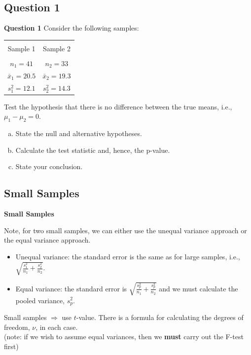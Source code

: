 \documentclass[compress]{beamer}        %
\makeatletter
\newcommand{\tcb}{\textcolor{beamer@blendedblue}}
\makeatother
\begin{document}
\subsection{Question 1}
\begin{frame}{\bf \tcb{Question 1}}
Consider the following samples:
\begin{center}
\begin{tabular}{|c|c|}
\hline
&\\[-0.3cm]
Sample 1 &  Sample 2 \\
\hline
&\\[-0.2cm]
$n_1 = 41$       & $n_2 = 33$       \\[0.2cm]
$\bar x_1 = 20.5$  & $\bar x_2 = 19.3$  \\[0.2cm]
$s_1^2 = 12.1$       & $s_2^2 = 14.3$        \\[0.2cm]
\hline
\end{tabular}
\end{center}

Test the hypothesis that there is no difference between the true means, i.e., $\mu_1-\mu_2=0$.\\
\begin{enumerate}[a)]\itemsep0.3cm
\item State the null and alternative hypotheses.
\item Calculate the test statistic and, hence, the p-value.
\item State your conclusion.
\end{enumerate}


\end{frame}







\subsection{Small Samples}
\begin{frame}{\bf \tcb{Small Samples}}

Note, for two small samples, we can either use the unequal variance approach or the equal variance approach.\\[0.4cm]
\begin{itemize}
\item Unequal variance: the standard error is the same as for large samples, i.e., $\sqrt{\frac{s_1^2}{n_1}+\frac{s_2^2}{n_2}}$.
\item Equal variance: the standard error is $\sqrt{\frac{s_p^2}{n_1}+\frac{s_p^2}{n_2}}$ and we must calculate the pooled variance, $s_p^2$.\\[0.8cm]
\end{itemize}

Small samples $\Rightarrow$ use $t$-value. There is a formula for calculating the degrees of freedom, $\nu$, in each case.\\[0.5cm]

{\footnotesize(note: if we wish to assume equal variances, then we {\bf must} carry out the F-test first)}

\end{frame}
\end{document}
